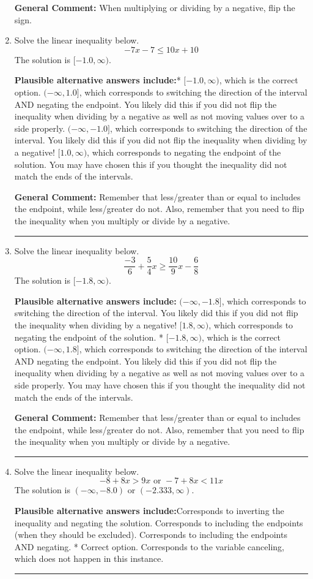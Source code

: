 \documentclass{extbook}[14pt]
\newcommand{\litem}[1]{\item #1

\rule{\textwidth}{0.4pt}}
\begin{document}
\begin{enumerate}
{\textbf{General Comment:} When multiplying or dividing by a negative, flip the sign.
}
\litem{
Solve the linear inequality below.
\[ -7x -7 \leq 10x + 10 \]The solution is \( [-1.0, \infty) \).\begin{enumerate}[label=\Alph*.]
\textbf{Plausible alternative answers include:}* $[-1.0, \infty)$, which is the correct option.
 $(-\infty, 1.0]$, which corresponds to switching the direction of the interval AND negating the endpoint. You likely did this if you did not flip the inequality when dividing by a negative as well as not moving values over to a side properly.
 $(-\infty, -1.0]$, which corresponds to switching the direction of the interval. You likely did this if you did not flip the inequality when dividing by a negative!
 $[1.0, \infty)$, which corresponds to negating the endpoint of the solution.
You may have chosen this if you thought the inequality did not match the ends of the intervals.
\end{enumerate}

\textbf{General Comment:} Remember that less/greater than or equal to includes the endpoint, while less/greater do not. Also, remember that you need to flip the inequality when you multiply or divide by a negative.
}
\litem{
Solve the linear inequality below.
\[ \frac{-3}{6} + \frac{5}{4} x \geq \frac{10}{9} x - \frac{6}{8} \]The solution is \( [-1.8, \infty) \).\begin{enumerate}[label=\Alph*.]
\textbf{Plausible alternative answers include:} $(-\infty, -1.8]$, which corresponds to switching the direction of the interval. You likely did this if you did not flip the inequality when dividing by a negative!
 $[1.8, \infty)$, which corresponds to negating the endpoint of the solution.
* $[-1.8, \infty)$, which is the correct option.
 $(-\infty, 1.8]$, which corresponds to switching the direction of the interval AND negating the endpoint. You likely did this if you did not flip the inequality when dividing by a negative as well as not moving values over to a side properly.
You may have chosen this if you thought the inequality did not match the ends of the intervals.
\end{enumerate}

\textbf{General Comment:} Remember that less/greater than or equal to includes the endpoint, while less/greater do not. Also, remember that you need to flip the inequality when you multiply or divide by a negative.
}
\litem{
Solve the linear inequality below.
\[ -8 + 8 x > 9 x \text{ or } -7 + 8 x < 11 x \]The solution is \( (-\infty, -8.0) \text{ or } (-2.333, \infty) \).\begin{enumerate}[label=\Alph*.]
\textbf{Plausible alternative answers include:}Corresponds to inverting the inequality and negating the solution.
Corresponds to including the endpoints (when they should be excluded).
Corresponds to including the endpoints AND negating.
 * Correct option.
Corresponds to the variable canceling, which does not happen in this instance.
\end{enumerate}

}
\end{enumerate}
\end{document}
